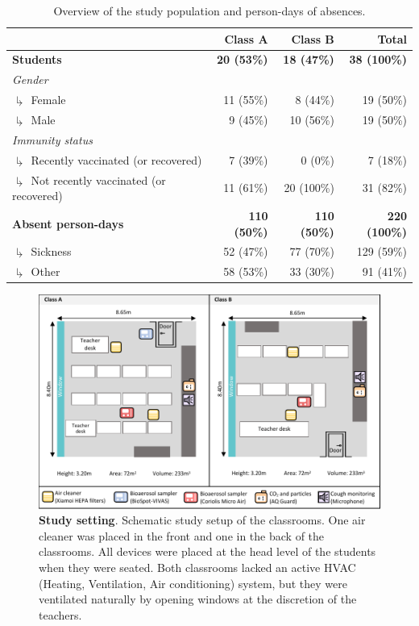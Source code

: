 \documentclass[fleqn,11pt]{wlscirep}
\begin{document}
\begin{table}[!htpb]
    \centering
    \caption{Overview of the study population and person-days of absences.}
    \label{tab:cases-overview-school}
    \footnotesize
    \renewcommand{\arraystretch}{1.5}
    \begin{tabular}{l r r r}
    \toprule
         &  Class A & Class B & Total \\ \midrule 
        \textbf{Students} & \textbf{20 (53\%)} & \textbf{18 (47\%)} & \textbf{38 (100\%)} \\
        \emph{Gender} \\
        $\drsh$ Female & 11 (55\%) & 8 (44\%) & 19 (\hphantom{0}50\%) \\
        $\drsh$ Male & 9 (45\%) & 10 (56\%) & 19 (\hphantom{0}50\%) \\
        \emph{Immunity status} \\
        $\drsh$ Recently vaccinated (or recovered) & 7 (39\%) & 0 (0\%) & 7 (\hphantom{0}18\%) \\
        $\drsh$ Not recently vaccinated (or recovered) & 11 (61\%) & 20 (100\%) & 31 (\hphantom{0}82\%) \\
        \textbf{Absent person-days} & \textbf{110 (50\%)} & \textbf{110 (50\%)} & \textbf{220 (100\%)} \\
        $\drsh$ Sickness & 52 (47\%) & 77 (70\%) & 129 (\hphantom{0}59\%) \\
        $\drsh$ Other & 58 (53\%) & 33 (30\%) & 91 (\hphantom{0}41\%) \\
        \bottomrule
    \end{tabular} 
\end{table}

\clearpage

\begin{figure}[!htpb]
    \centering
    \includegraphics{../study_setting.pdf}
    \caption{\textbf{Study setting}. Schematic study setup of the classrooms. One air cleaner was placed in the front and one in the back of the classrooms. All devices were placed at the head level of the students when they were seated. Both classrooms lacked an active HVAC (Heating, Ventilation, Air conditioning) system, but they were ventilated naturally by opening windows at the discretion of the teachers. }
    \label{fig:study-setup}
\end{figure}
\end{document}
